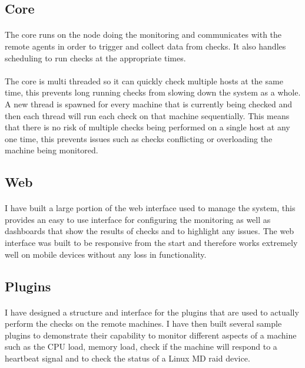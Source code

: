 \documentclass[bsc,logo,twoside]{infthesis}
\begin{document}
\subsection{Core}
\paragraph*{}
	The core runs on the node doing the monitoring and communicates with the
	remote agents in order to trigger and collect data from checks.  It also
	handles scheduling to run checks at the appropriate times.

\paragraph*{}
	The core is
	multi threaded so it can quickly check multiple hosts at the same time, this
	prevents long running checks from slowing down the system as a whole.  A new
	thread is spawned for every machine that is currently being checked and then
	each thread will run each check on that machine sequentially. This means that
	there is no risk of multiple checks being performed on a single host at any
	one time, this prevents issues such as checks conflicting or overloading the
	machine being monitored.
	
\subsection{Web}
\paragraph*{}
	I have built a large portion of the web interface used to manage the system,
	this provides an easy to use interface for configuring the monitoring as well
	as dashboards that show the results of checks and to highlight any issues.
	The web interface was built to be responsive from the start and therefore
	works extremely well on mobile devices without any loss in functionality.
	
\subsection*{Plugins}
\paragraph*{}
	I have designed a structure and interface for the plugins that are used to
	actually perform the checks on the remote machines. I have then built several
	sample plugins to demonstrate their capability to monitor different aspects of
	a machine such as the CPU load, memory load, check if the machine will respond
	to a heartbeat signal and to check the status of a Linux MD raid device.
	
\end{document}
